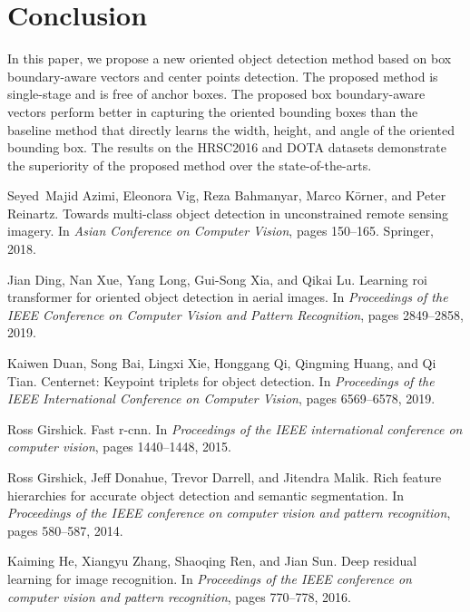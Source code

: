 \documentclass[10pt,twocolumn,letterpaper]{article}
\begin{document}
%
 



\section{Conclusion}
In this paper, we propose a new oriented object detection method based on box boundary-aware vectors and center points detection. The proposed method is single-stage and is free of anchor boxes.  The proposed box boundary-aware vectors perform better in capturing the oriented bounding boxes than the baseline method that directly learns the width, height, and angle of the oriented bounding box. The results on the HRSC2016 and DOTA datasets demonstrate the superiority of the proposed method over the state-of-the-arts.


\begin{thebibliography}{10}\itemsep=-1pt

Seyed~Majid Azimi, Eleonora Vig, Reza Bahmanyar, Marco K{\"o}rner, and Peter
  Reinartz.
\newblock Towards multi-class object detection in unconstrained remote sensing
  imagery.
\newblock In {\em Asian Conference on Computer Vision}, pages 150--165.
  Springer, 2018.

Jian Ding, Nan Xue, Yang Long, Gui-Song Xia, and Qikai Lu.
\newblock Learning roi transformer for oriented object detection in aerial
  images.
\newblock In {\em Proceedings of the IEEE Conference on Computer Vision and
  Pattern Recognition}, pages 2849--2858, 2019.

Kaiwen Duan, Song Bai, Lingxi Xie, Honggang Qi, Qingming Huang, and Qi Tian.
\newblock Centernet: Keypoint triplets for object detection.
\newblock In {\em Proceedings of the IEEE International Conference on Computer
  Vision}, pages 6569--6578, 2019.

Ross Girshick.
\newblock Fast r-cnn.
\newblock In {\em Proceedings of the IEEE international conference on computer
  vision}, pages 1440--1448, 2015.

Ross Girshick, Jeff Donahue, Trevor Darrell, and Jitendra Malik.
\newblock Rich feature hierarchies for accurate object detection and semantic
  segmentation.
\newblock In {\em Proceedings of the IEEE conference on computer vision and
  pattern recognition}, pages 580--587, 2014.

Kaiming He, Xiangyu Zhang, Shaoqing Ren, and Jian Sun.
\newblock Deep residual learning for image recognition.
\newblock In {\em Proceedings of the IEEE conference on computer vision and
  pattern recognition}, pages 770--778, 2016.


\end{thebibliography}
\end{document}

